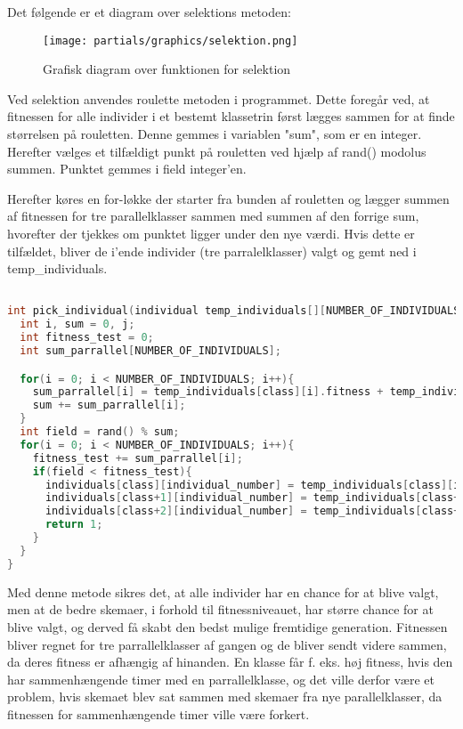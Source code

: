 Det følgende er et diagram over selektions metoden:
\begin{figure}[!h]
\texttt{[image: partials/graphics/selektion.png]}
\caption{Grafisk diagram over funktionen for selektion}
\label{fig:diagramselektion}
\end{figure}

Ved selektion anvendes roulette metoden i programmet. Dette foregår ved, at fitnessen for alle individer i et bestemt klassetrin først lægges sammen for at finde størrelsen på rouletten. Denne gemmes i variablen "sum", som er en integer. Herefter vælges et tilfældigt punkt på rouletten ved hjælp af rand() modolus summen. Punktet gemmes i field integer'en.

Herefter køres en for-løkke der starter fra bunden af rouletten og lægger summen af fitnessen for tre parallelklasser sammen med summen af den forrige sum, hvorefter der tjekkes om punktet ligger under den nye værdi. Hvis dette er tilfældet, bliver de i'ende individer (tre parralelklasser) valgt og gemt ned i temp\_individuals.  

\begin{lstlisting}[language = c]

int pick_individual(individual temp_individuals[][NUMBER_OF_INDIVIDUALS], individual individuals[][NUMBER_OF_INDIVIDUALS], int class, int individual_number){
  int i, sum = 0, j;
  int fitness_test = 0;
  int sum_parrallel[NUMBER_OF_INDIVIDUALS];

  for(i = 0; i < NUMBER_OF_INDIVIDUALS; i++){
    sum_parrallel[i] = temp_individuals[class][i].fitness + temp_individuals[class+1][i].fitness + temp_individuals[class+2][i].fitness;
    sum += sum_parrallel[i];
  }
  int field = rand() % sum;
  for(i = 0; i < NUMBER_OF_INDIVIDUALS; i++){
    fitness_test += sum_parrallel[i];
    if(field < fitness_test){
      individuals[class][individual_number] = temp_individuals[class][i];
      individuals[class+1][individual_number] = temp_individuals[class+1][i];
      individuals[class+2][individual_number] = temp_individuals[class+2][i];
      return 1;
    }
  } 
}

\end{lstlisting}

Med denne metode sikres det, at alle individer har en chance for at blive valgt, men at de bedre skemaer, i forhold til fitnessniveauet, har større chance for at blive valgt, og derved få skabt den bedst mulige fremtidige generation. Fitnessen bliver regnet for tre parrallelklasser af gangen og de bliver sendt videre sammen, da deres fitness er afhængig af hinanden. En klasse får f. eks. høj fitness, hvis den har sammenhængende timer med en parrallelklasse, og det ville derfor være et problem, hvis skemaet blev sat sammen med skemaer fra nye parallelklasser, da fitnessen for sammenhængende timer ville være forkert.